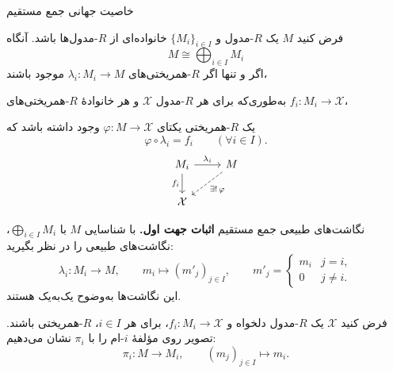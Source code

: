\begin{frame}[t]{خاصیت جهانی جمع مستقیم}
    \label{lec08:direct-sum-universal-property}
    \begin{theorem}
        فرض کنید $M$ یک $R$-مدول و $\{M_i\}_{i\in I}$ خانواده‌ای از $R$-مدول‌ها باشد.
        آنگاه
        \[
            M\cong\bigoplus_{i\in I}M_i
        \]
        اگر و تنها اگر $R$-همریختی‌های $\lambda_i:M_i\to M$ موجود باشند،\par
        به‌طوری‌که برای هر $R$-مدول $\mathcal{X}$ و هر خانوادهٔ
        $R$-همریختی‌های $f_i:M_i\to\mathcal{X}$،\par
        یک $R$-همریختی یکتای
        $\varphi:M\to\mathcal{X}$ وجود داشته باشد که
        \[
            \varphi\circ\lambda_i=f_i\qquad(\forall i\in I).
        \]
        \[
            \begin{tikzcd}[ampersand replacement=\&]
                M_i\arrow[r,"\lambda_i"]\arrow[d,"f_i" swap]
                \& M\arrow[dl,dashed,"\exists!\,\varphi"]\\
                \mathcal{X}\&
            \end{tikzcd}
        \]
    \end{theorem}
\end{frame}

\begin{frame}[t]{نگاشت‌های طبیعی جمع مستقیم}
    \label{lec08:natural-maps}
    \textbf{اثبات جهت اول.}
    با شناسایی $M$ با $\bigoplus_{i\in I}M_i$، نگاشت‌های طبیعی را در نظر بگیرید:
    \[
        \lambda_i:M_i\longrightarrow M,
        \qquad m_i\longmapsto(m'_j)_{j\in I},
        \qquad
        m'_j=\begin{cases}
            m_i&j=i,\\
            0&j\ne i.
        \end{cases}
    \]
    این نگاشت‌ها به‌وضوح یک‌به‌یک هستند.

    \medskip
    فرض کنید $\mathcal{X}$ یک $R$-مدول دلخواه و
    $f_i:M_i\to\mathcal{X}$، برای هر $i\in I$، $R$-همریختی باشند.
    تصویر روی مؤلفهٔ $i$-ام را با $\pi_i$ نشان می‌دهیم:
    \[
        \pi_i:M\longrightarrow M_i,
        \qquad (m_j)_{j\in I}\longmapsto m_i.
    \]
\end{frame}


